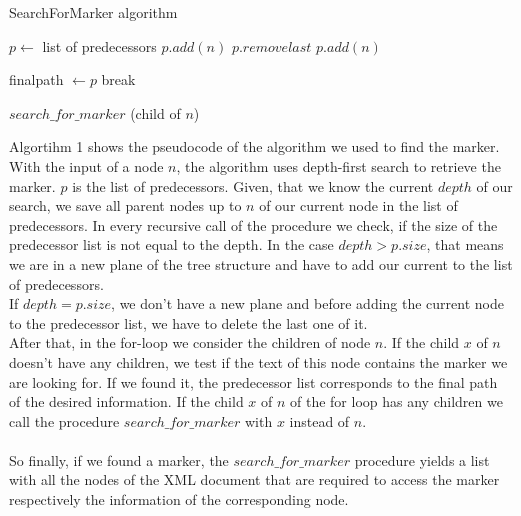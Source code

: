 \begin{algorithm}
\caption{SearchForMarker algorithm}\label{euclid}
\begin{algorithmic}[1]
\State $p\gets$ list of predecessors
\State $p.add (n)$
\Else
\State $p.removelast$
\State $p.add (n)$
\EndIf

\State finalpath $\gets p$
\State break
\EndIf

\Else 
\State$search\_for\_marker$ (child of $n$)
\EndIf
\EndFor
\EndProcedure
\end{algorithmic}
\end{algorithm}

Algortihm 1 shows the pseudocode of the algorithm we used to find the marker. With the input of a node $n$, the algorithm uses depth-first search to retrieve the marker. $p$ is the list of predecessors. Given, that we know the current $depth$ of our search, we save all parent nodes up to $n$ of our current node in the list of predecessors. In every recursive call of the procedure we check, if the size of the predecessor list is not equal to the depth. In the case $depth > p.size$, that means we are in a new plane of the tree structure and have to add our current to the list of predecessors. \\ If $depth = p.size$, we don't have a new plane and before adding the current node to the predecessor list, we have to delete the last one of it. \\ After that, in the for-loop we consider the children of node $n$. If the child $x$ of $n$ doesn't have any children, we test if the text of this node contains the marker we are looking for. If we found it, the predecessor list corresponds to the final path of the desired information. If the child $x$ of $n$ of the for loop has any children we call the procedure $search\_for\_marker$ with $x$ instead of $n$. \\ \\
So finally, if we found a marker, the $search\_for\_marker$ procedure yields a list with all the nodes of the XML document that are required to access the marker respectively the information of the corresponding node.



